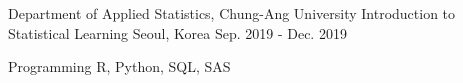 \documentclass[11pt, a4paper]{awesome-cv} %
\begin{document}

\begin{cventries}
	\cventry
	{Department of Applied Statistics, Chung-Ang University} %
	{Introduction to Statistical Learning} %
	{Seoul, Korea} %
	{Sep. 2019 - Dec. 2019} %
	{ %
	}
\end{cventries}


\begin{cvskills}
	\cvskill
	{Programming} %
	{R, Python, SQL, SAS} %
\end{cvskills}



%
%
%
%
%
%
%


%
%
%
%

\end{document}
